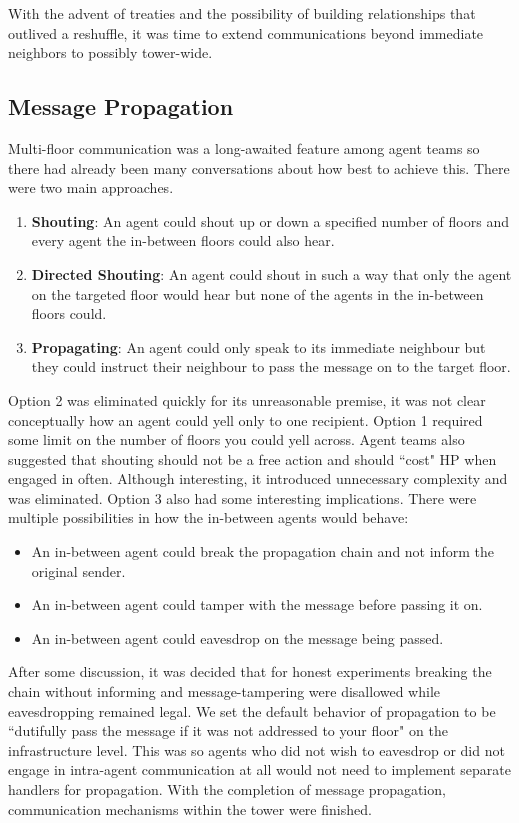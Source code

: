 With the advent of treaties and the possibility of building relationships that outlived a reshuffle, it was time to extend communications beyond immediate neighbors to possibly tower-wide.

\subsection{Message Propagation}
Multi-floor communication was a long-awaited feature among agent teams so there had already been many conversations about how best to achieve this. There were two main approaches.
\begin{enumerate}
    \item \textbf{Shouting}: An agent could shout up or down a specified number of floors and every agent the in-between floors could also hear.
    \item \textbf{Directed Shouting}: An agent could shout in such a way that only the agent on the targeted floor would hear but none of the agents in the in-between floors could.
    \item \textbf{Propagating}: An agent could only speak to its immediate neighbour but they could instruct their neighbour to pass the message on to the target floor.
\end{enumerate}
Option 2 was eliminated quickly for its unreasonable premise, it was not clear conceptually how an agent could yell only to one recipient. \newline
Option 1 required some limit on the number of floors you could yell across. Agent teams also suggested that shouting should not be a free action and should ``cost" HP when engaged in often. Although interesting, it introduced unnecessary complexity and was eliminated. \newline
Option 3 also had some interesting implications. There were multiple possibilities in how the in-between agents would behave:
\begin{itemize}
    \item An in-between agent could break the propagation chain and not inform the original sender.
    \item An in-between agent could tamper with the message before passing it on.
    \item An in-between agent could eavesdrop on the message being passed.
\end{itemize}
After some discussion, it was decided that for honest experiments breaking the chain without informing and message-tampering were disallowed while eavesdropping remained legal. \newline
We set the default behavior of propagation to be ``dutifully pass the message if it was not addressed to your floor" on the infrastructure level. This was so agents who did not wish to eavesdrop or did not engage in intra-agent communication at all would not need to implement separate handlers for propagation. \newline
With the completion of message propagation, communication mechanisms within the tower were finished.
